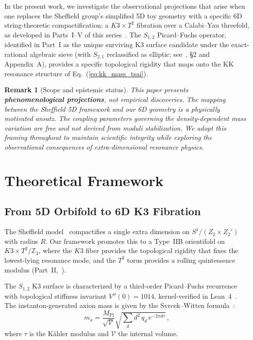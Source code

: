 \documentclass[12pt]{article}
\newtheorem{remark}{Remark}
\begin{document}
In the present work, we investigate the observational projections that arise when one replaces the Sheffield group's simplified 5D toy geometry with a specific 6D string-theoretic compactification: a $K3 \times T^2$ fibration over a Calabi--Yau threefold, as developed in Parts~I--V of this series~\cite{callens2026partI, callens2026partII}.
The $S_{1,2}$ Picard--Fuchs operator, identified in Part~I as the unique surviving K3 surface candidate under the exact-rational algebraic sieve (with $S_{2,1}$ reclassified as elliptic; see~\cite{callens2026partI}, \S2 and Appendix~A), provides a specific topological rigidity that maps onto the KK resonance structure of Eq.~(\ref{eq:kk_mass_tsai}).

\begin{remark}[Scope and epistemic status]
This paper presents \textbf{phenomenological projections}, not empirical discoveries.
The mapping between the Sheffield 5D framework and our 6D geometry is a physically motivated \emph{ansatz}.
The coupling parameters governing the density-dependent mass variation are free and not derived from moduli stabilization.
We adopt this framing throughout to maintain scientific integrity while exploring the observational consequences of extra-dimensional resonance physics.
\end{remark}

\section{Theoretical Framework}
\label{sec:theory}

\subsection{From 5D Orbifold to 6D K3 Fibration}

The Sheffield model~\cite{tsai2026} compactifies a single extra dimension on $S^1/(Z_2 \times Z_2')$ with radius $R$.
Our framework promotes this to a Type~IIB orientifold on $K3 \times T^2 / \mathbb{Z}_2$, where the $K3$ fiber provides the topological rigidity that fixes the lowest-lying resonance mode, and the $T^2$ torus provides a rolling quintessence modulus (Part~II,~\cite{callens2026partII}).

The $S_{1,2}$ K3 surface is characterized by a third-order Picard--Fuchs recurrence with topological stiffness invariant $V''(0) = 1014$, kernel-verified in Lean~4~\cite{callens2026partI}.
The instanton-generated axion mass is given by the Svrcek--Witten formula~\cite{svrcek2006}:
\begin{equation}
\label{eq:svrcek_witten}
m_a = \frac{M_{\mathrm{Pl}}}{\sqrt{\mathcal{V}}} \sqrt{\sum_d d^2 \, q_d \, e^{-2\pi d \tau}}\,,
\end{equation}
where $\tau$ is the K\"ahler modulus and $\mathcal{V}$ the internal volume.
\end{document}

